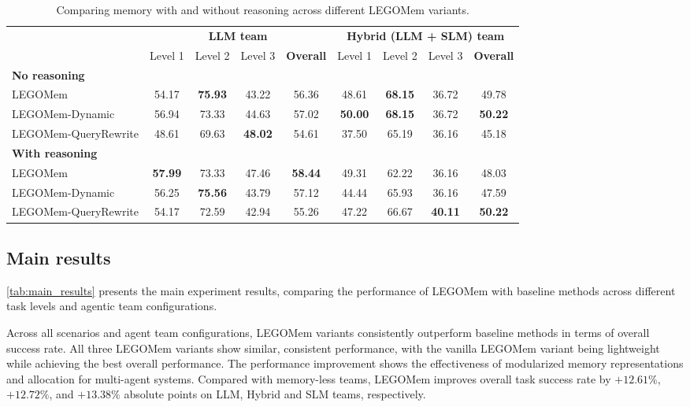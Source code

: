 \documentclass[sigconf]{aamas}
\newcommand{\legomem}{LEGOMem}
\newcommand{\dynalegomem}{LEGOMem-Dynamic}
\newcommand{\queryrewritelegomem}{LEGOMem-QueryRewrite}
\begin{document}
\begin{table}[t]
\centering
\caption{Comparing memory with and without reasoning across different \legomem{} variants.}
\label{tab:memory_representation}
\begin{tabular}{lcccccccc}
\toprule
 & \multicolumn{4}{c}{\textbf{LLM team}} & \multicolumn{4}{c}{\textbf{Hybrid (LLM + SLM) team}} \\
 & Level 1 & Level 2 & Level 3 & \textbf{Overall} & Level 1 & Level 2 & Level 3 & \textbf{Overall} \\
\midrule
\rowcolor{gray!24}
\textbf{No reasoning} & & & & & & & & \\
\legomem{} & 54.17 & \textbf{75.93} & 43.22 & 56.36 & 48.61 & \textbf{68.15}  & 36.72 & 49.78 \\
\dynalegomem{} & 56.94 & 73.33 & 44.63 & 57.02 & \textbf{50.00} & \textbf{68.15}  & 36.72 & \textbf{50.22} \\
\queryrewritelegomem{} & 48.61 & 69.63 & \textbf{48.02} & 54.61 & 37.50 & 65.19  & 36.16 & 45.18  \\
\rowcolor{gray!24}
\textbf{With reasoning} & & & & & & & & \\
\legomem{} & \textbf{57.99} & 73.33 & 47.46 & \textbf{58.44} & 49.31 & 62.22  & 36.16 & 48.03 \\
\dynalegomem{} & 56.25 & \textbf{75.56} & 43.79 & 57.12 & 44.44 & 65.93  & 36.16 & 47.59 \\
\queryrewritelegomem{} & 54.17 & 72.59 & 42.94 & 55.26 & 47.22 & 66.67 & \textbf{40.11} & \textbf{50.22} \\
\bottomrule
\end{tabular}
\end{table}


\subsection{Main results}
\autoref{tab:main_results} presents the main experiment results, comparing the performance of \legomem{} with baseline methods across different task levels and agentic team configurations. 

Across all scenarios and agent team configurations, \legomem{} variants consistently outperform baseline methods in terms of overall success rate. All three \legomem{} variants show similar, consistent performance, with the vanilla \legomem{} variant being lightweight while achieving the best overall performance. The performance improvement shows the effectiveness of modularized memory representations and allocation for multi-agent systems.
Compared with memory-less teams, \legomem{} improves overall task success rate by $+12.61\%$, $+12.72\%$, and $+13.38\%$ absolute points on LLM, Hybrid and SLM teams, respectively.
\end{document}
